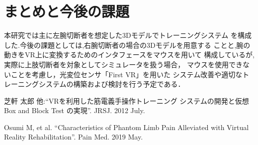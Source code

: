 \documentclass{ltjsarticle}
\begin{document}
\section{まとめと今後の課題}
	本研究では主に左腕切断者を想定した3Dモデルでトレーニングシステム
	を構成した.今後の課題としては,右腕切断者の場合の3Dモデルを用意する
	ことと,腕の動きをVR上に変換するためのインタフェースをマウスを用いて
	構成しているが,実際に上肢切断者を対象としてシミュレータを扱う場合，
	マウスを使用できないことを考慮し，光変位センサ「First VR」を用いた
	システム改善や適切なトレーニングシステムの構築および検討を行う予定である．
\vspace{-12pt}
\begin{thebibliography}{99}%
	芝軒 太郎 他:``VRを利用した筋電義手操作トレーニング
	システムの開発と仮想 Box and Block Test の実現''. 
	JRSJ. 2012 July.

	Osumi M, et al.
	``Characteristics of Phantom Limb Pain Alleviated 
	with Virtual Reality Rehabilitation''. 
	Pain Med. 2019 May.
\end{thebibliography}
\end{document}
